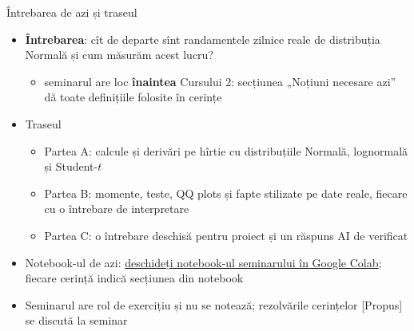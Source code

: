 \begin{frame}{Întrebarea de azi și traseul}
\itemsize{\small}
\begin{itemize}
    \item \textbf{Întrebarea}: cît de departe sînt randamentele zilnice reale de distribuția Normală și cum măsurăm acest lucru?
    \begin{itemize}
        \item seminarul are loc \textbf{înaintea} Cursului 2: secțiunea „Noțiuni necesare azi” dă toate definițiile folosite în cerințe
    \end{itemize}
    \item Traseul
    \begin{itemize}
        \item Partea A: calcule și derivări pe hîrtie cu distribuțiile Normală, lognormală și Student-$t$
        \item Partea B: momente, teste, QQ plots și fapte stilizate pe date reale, fiecare cu o întrebare de interpretare
        \item Partea C: o întrebare deschisă pentru proiect și un răspuns AI de verificat
    \end{itemize}
    \item Notebook-ul de azi: \href{\nb}{deschideți notebook-ul seminarului în Google Colab}; fiecare cerință indică secțiunea din notebook
    \item Seminarul are rol de exercițiu și nu se notează; rezolvările cerințelor [Propus] se discută la seminar
\end{itemize}
\end{frame}

